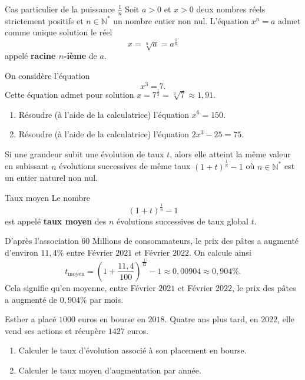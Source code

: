 \documentclass[11pt]{article}
\begin{document}
\begin{propnom}{Cas particulier de la puissance $\frac{1}{n}$}
  Soit $a>0$ et $x>0$ deux nombres réels strictement positifs et
  $n\in\mathbb{N}^*$ un nombre
  entier non nul. L'équation $x^n=a$ admet comme unique solution le réel
  \[
    x = \sqrt[n]{a}=a^{\frac{1}{n}}
  \]
  appelé \textbf{racine $n$-ième} de $a$.
\end{propnom}
\begin{exemple}
  On considère l'équation
  \[
    x^3 = 7.
  \]
  Cette équation admet pour solution $x = 7^{\frac{1}{3}} =
  \sqrt[3]{7}\approx1,91$.
\end{exemple}
\begin{app}
  \begin{enumerate}
    \item Résoudre (à l'aide de la calculatrice) l'équation $x^6=150$.
    \item Résoudre (à l'aide de la calculatrice) l'équation $2x^3-25=75$.
  \end{enumerate}
\end{app}
\begin{prop}
  Si une grandeur subit une évolution de taux $t$, alors elle atteint la même
  valeur en subissant $n$ évolutions successives de même taux $\left( 1+t
  \right)^{\frac{1}{n}}-1$ où $n\in\mathbb{N}^*$ est un entier naturel non nul.
\end{prop}
\begin{defi}{Taux moyen}
  Le nombre
  \[
    \left( 1+t \right)^{\frac{1}{n}}-1
  \]
  est appelé \textbf{taux moyen} des $n$ évolutions successives de taux global
  $t$.
\end{defi}
\begin{exemple}
  D'après l'association $60$ Millions de consommateurs, le prix des p\^ates a
  augmenté d'environ $11,4$\% entre Février $2021$ et Février $2022$. On calcule
  ainsi
  \[
    t_{\text{moyen}} = \left( 1+\frac{11,4}{100}
    \right)^{\frac{1}{12}}-1\approx0,00904\approx0,904\%.
  \]
  Cela signifie qu'en moyenne, entre Février $2021$ et Février $2022$, le prix
  des p\^ates a augmenté de $0,904$\% par mois.
\end{exemple}
\begin{app}
 Esther a placé $1000$ euros en bourse en $2018$. Quatre ans plus tard, en $2022$, elle vend ses
 actions et récupère $1427$ euros.
 \begin{enumerate}
   \item Calculer le taux d'évolution associé à son placement en bourse.
   \item Calculer le taux moyen d'augmentation par année.
 \end{enumerate}
\end{app}
\end{document}
